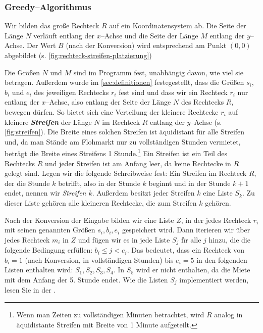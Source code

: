 \subsubsection{Greedy--Algorithmus}\label{sec:greedy}

Wir bilden das große Rechteck $R$ auf ein Koordinatensystem ab.
Die Seite der Länge $N$ verläuft entlang der $x$--Achse und die Seite der Länge
$M$ entlang der $y$--Achse.
Der Wert $B$ (nach der Konversion) wird entsprechend am Punkt $(0, 0)$ abgebildet (s. \cref{fig:rechteck-streifen-platzierung})

Die Größen $N$ und $M$ sind im Programm fest, unabhängig davon, wie viel sie betragen.
Außerdem wurde im \cref{sec:definitionen} festegestellt, dass die Größen $s_i$, $b_i$ und $e_i$
des jeweiligen Rechtecks $r_i$ fest sind und dass wir ein Rechteck $r_i$ nur entlang der $x$--Achse,
also entlang der Seite der Länge $N$ des Rechtecks $R$, bewegen dürfen.
So bietet sich eine Verteilung der kleinere Rechtecke $r_i$ auf kleinere \textit{\textbf{Streifen}}
der Länge $N$ im Rechteck $R$ entlang der $y$--Achse (s. \cref{fig:streifen}).
Die Breite eines solchen Streifen ist äquidistant für alle Streifen und, da
man Stände am Flohmarkt nur zu vollständigen Stunden vermietet, 
beträgt die Breite eines Streifens 1 Stunde.\footnote{Wenn man Zeiten zu
vollständigen Minuten betrachtet,
wird $R$ analog in äquidistante Streifen mit Breite von 1 Minute aufgeteilt.}
Ein Streifen ist ein Teil des Rechtecks $R$ und jeder Streifen ist
am Anfang leer, da keine Rechtecke in $R$ gelegt sind.
Legen wir die folgende Schreibweise fest: Ein Streifen im Rechteck $R$, der die
Stunde $k$ betrifft, also in der Stunde $k$ beginnt und in der Stunde $k+1$ endet, nennen wir 
\textit{Streifen $k$}. Außerdem besitzt jeder Streifen $k$ eine Liste $S_k$.
Zu dieser Liste gehören alle kleineren Rechtecke, die zum Streifen $k$ gehören.

Nach der Konversion der Eingabe bilden wir eine Liste $Z$, in der jedes
Rechteck $r_i$ mit seinen genannten Größen $s_i, b_i, e_i$ gespeichert wird.
Dann iterieren wir über jedes Rechteck $m_i$ in $Z$ und fügen wir es in jede Liste $S_j$ fïr alle
$j$ hinzu, die die folgende Bedingung erfüllen: $b_i \leqslant j < e_i$.
Das bedeutet, dass ein Rechteck von $b_i = 1$ (nach Konversion, in vollständigen Stunden)
bis $e_i = 5$ in den folgenden Listen enthalten wird: $S_1, S_2, S_3, S_4$.
In $S_5$ wird er nicht enthalten, da die Miete mit dem Anfang der 5. Stunde endet.
Wie die Listen $S_j$ implementiert werden, lesen Sie in der .


